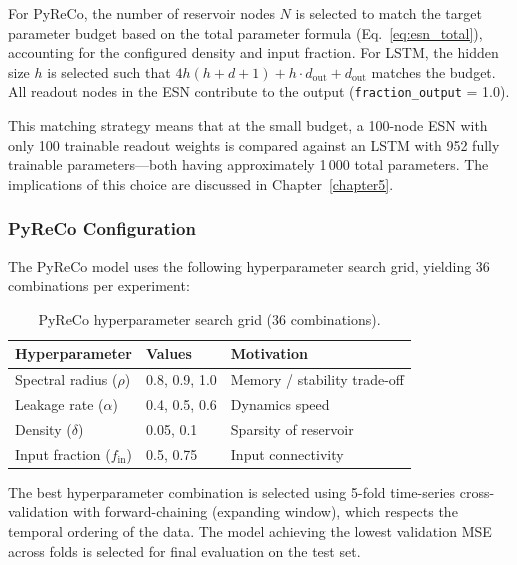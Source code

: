 For PyReCo, the number of reservoir nodes $N$ is selected to match the target parameter budget based on the total parameter formula (Eq.~\ref{eq:esn_total}), accounting for the configured density and input fraction. For LSTM, the hidden size $h$ is selected such that $4h(h + d + 1) + h \cdot d_{\text{out}} + d_{\text{out}}$ matches the budget. All readout nodes in the ESN contribute to the output (\texttt{fraction\_output} = 1.0).

This matching strategy means that at the small budget, a 100-node ESN with only 100 trainable readout weights is compared against an LSTM with 952 fully trainable parameters---both having approximately 1\,000 total parameters. The implications of this choice are discussed in Chapter~\ref{chapter5}.

\subsubsection{PyReCo Configuration}
\label{sec:pyreco_config}

The PyReCo model uses the following hyperparameter search grid, yielding 36 combinations per experiment:

\begin{table}[H]
\centering
\caption{PyReCo hyperparameter search grid (36 combinations).}
\label{tab:pyreco_grid}
\begin{tabular}{@{}lll@{}}
\toprule
Hyperparameter & Values & Motivation \\
\midrule
Spectral radius ($\rho$)    & 0.8, 0.9, 1.0 & Memory / stability trade-off \\
Leakage rate ($\alpha$)      & 0.4, 0.5, 0.6 & Dynamics speed \\
Density ($\delta$)           & 0.05, 0.1     & Sparsity of reservoir \\
Input fraction ($f_{\text{in}}$) & 0.5, 0.75  & Input connectivity \\
\bottomrule
\end{tabular}
\end{table}

The best hyperparameter combination is selected using 5-fold time-series cross-validation with forward-chaining (expanding window), which respects the temporal ordering of the data. The model achieving the lowest validation MSE across folds is selected for final evaluation on the test set.

